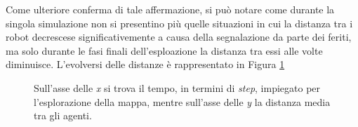 Come ulteriore conferma di tale affermazione, si può notare come durante la singola simulazione non si presentino più quelle situazioni in cui la distanza tra i robot decrescese significativemente a causa della segnalazione da parte dei feriti, ma solo durante le fasi finali dell'esploazione la distanza tra essi alle volte diminuisce.
L'evolversi delle distanze è rappresentato in Figura \ref{fig:gammaHSim}
\begin{figure}
	\hfill
	\caption{Sull'asse delle \textit{x} si trova il tempo, in termini di \textit{step}, impiegato per l'esplorazione della mappa, mentre sull'asse delle \textit{y} la distanza media tra gli agenti.}
	\label{fig:gammaHSim}
\end{figure}
